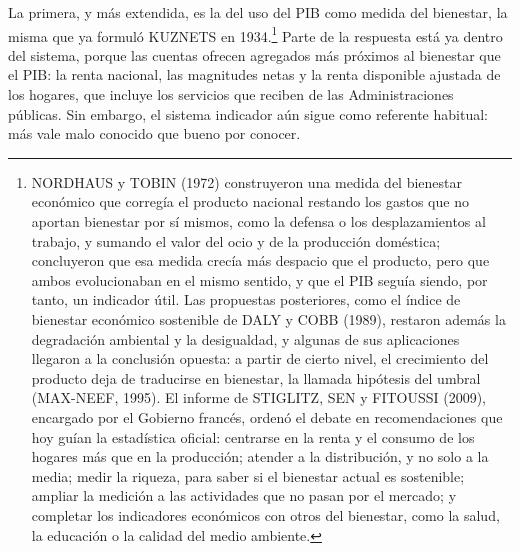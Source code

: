 \documentclass[10pt,a4paper]{article}
\begin{document}
La primera, y más extendida, es la del uso del PIB como medida del bienestar, la misma que ya formuló KUZNETS en 1934.\footnote{%
  NORDHAUS y TOBIN (1972) construyeron una medida del bienestar económico que corregía el producto nacional restando los gastos que no aportan bienestar por sí mismos, como la defensa o los desplazamientos al trabajo, y sumando el valor del ocio y de la producción doméstica; concluyeron que esa medida crecía más despacio que el producto, pero que ambos evolucionaban en el mismo sentido, y que el PIB seguía siendo, por tanto, un indicador útil. Las propuestas posteriores, como el índice de bienestar económico sostenible de DALY y COBB (1989), restaron además la degradación ambiental y la desigualdad, y algunas de sus aplicaciones llegaron a la conclusión opuesta: a partir de cierto nivel, el crecimiento del producto deja de traducirse en bienestar, la llamada hipótesis del umbral (MAX-NEEF, 1995). El informe de STIGLITZ, SEN y FITOUSSI (2009), encargado por el Gobierno francés, ordenó el debate en recomendaciones que hoy guían la estadística oficial: centrarse en la renta y el consumo de los hogares más que en la producción; atender a la distribución, y no solo a la media; medir la riqueza, para saber si el bienestar actual es sostenible; ampliar la medición a las actividades que no pasan por el mercado; y completar los indicadores económicos con otros del bienestar, como la salud, la educación o la calidad del medio ambiente.
} Parte de la respuesta está ya dentro del sistema, porque las cuentas ofrecen agregados más próximos al bienestar que el PIB: la renta nacional, las magnitudes netas y la renta disponible ajustada de los hogares, que incluye los servicios que reciben de las Administraciones públicas. Sin embargo, el sistema indicador aún sigue como referente habitual: más vale malo conocido que bueno por conocer.
\end{document}

